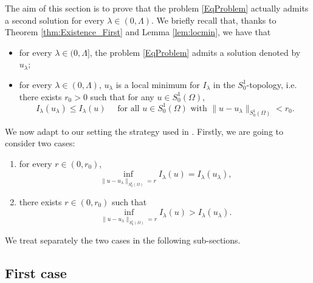 \documentclass[11pt]{amsart}
\numberwithin{equation}{section} %
\theoremstyle{definition}
\begin{document}
The aim of this section is to prove that the problem \eqref{EqProblem} actually admits a second
solution for every $\lambda\in (0,\Lambda)$.
We briefly recall that, thanks to Theorem \ref{thm:Existence_First} and Lemma \ref{lem:locmin}, we have that 
\begin{itemize}
	\item for every $\lambda \in (0,\Lambda]$, the problem \eqref{EqProblem} admits a solution denoted by $u_{\lambda}$;
	\item for every $\lambda \in (0,\Lambda)$, $u_{\lambda}$ is a local minimum for $I_{\lambda}$ in the $S_{0}^{1}$-topology, i.e.
	there exists $r_0>0$ such that for any $u\in S^1_0(\Omega)$,
	\[
	I_\lambda(u_\lambda)\leq I_\lambda(u) \quad \textrm{ for all } u\in S^{1}_{0}(\Omega) \textrm{ with } \|u-u_\lambda\|_{S_{0}^{1}(\Omega)}< r_0 .
	\]
\end{itemize}

We now adapt to our setting the strategy used in \cite{Tarantello}.
Firstly, we are going to consider two cases:
\begin{enumerate}
	\item for every $r\in (0,r_0)$,
	\[
	\inf_{\|u-u_\lambda\|_{S_{0}^{1}(\Omega)}=r}I_\lambda(u)=I_\lambda(u_\lambda),
	\]
	\item there exists $r\in (0,r_0)$ such that 
	\[
	\inf_{\|u-u_\lambda\|_{S_{0}^{1}(\Omega)}=r}I_\lambda(u)>I_\lambda(u_\lambda).
	\]
\end{enumerate}
We treat separately the two cases in the following sub-sections. 
\newline

\subsection{First case}\label{subsec:CaseI}

\end{document}
